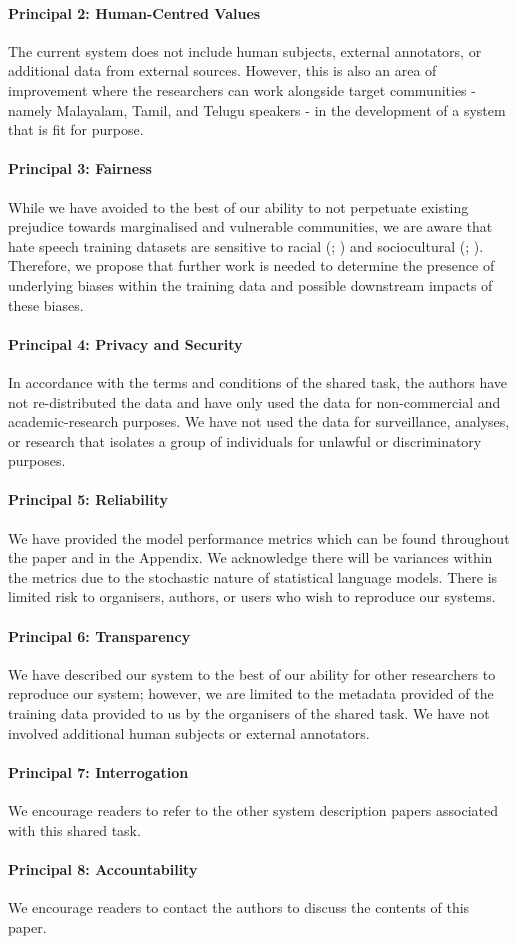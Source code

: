 \documentclass[11pt]{article}
\begin{document}
    \paragraph{Principal 2: Human-Centred Values} The current system does not include human subjects, external annotators, or additional data from external sources. However, this is also an area of improvement where the researchers can work alongside target communities - namely Malayalam, Tamil, and Telugu speakers - in the development of a system that is fit for purpose.

    \paragraph{Principal 3: Fairness} While we have avoided to the best of our ability to not perpetuate existing prejudice towards marginalised and vulnerable communities, we are aware that hate speech training datasets are sensitive to racial (\citealp{davidson_racial_2019}; \citealp{sap_risk_2019}) and sociocultural (\citealp{lee_hate_2023}; \citealp{wong_sociocultural_2024}). Therefore, we propose that further work is needed to determine the presence of underlying biases within the training data and possible downstream impacts of these biases.

    \paragraph{Principal 4: Privacy and Security} In accordance with the terms and conditions of the shared task, the authors have not re-distributed the data and have only used the data for non-commercial and academic-research purposes. We have not used the data for surveillance, analyses, or research that isolates a group of individuals for unlawful or discriminatory purposes.

    \paragraph{Principal 5: Reliability} We have provided the model performance metrics which can be found throughout the paper and in the Appendix. We acknowledge there will be variances within the metrics due to the stochastic nature of statistical language models. There is limited risk to organisers, authors, or users who wish to reproduce our systems.
    
    \paragraph{Principal 6: Transparency} We have described our system to the best of our ability for other researchers to reproduce our system; however, we are limited to the metadata provided of the training data provided to us by the organisers of the shared task. We have not involved additional human subjects or external annotators.

    \paragraph{Principal 7: Interrogation} We encourage readers to refer to the other system description papers associated with this shared task.

    \paragraph{Principal 8: Accountability}  We encourage readers to contact the authors to discuss the contents of this paper.
\end{document}
